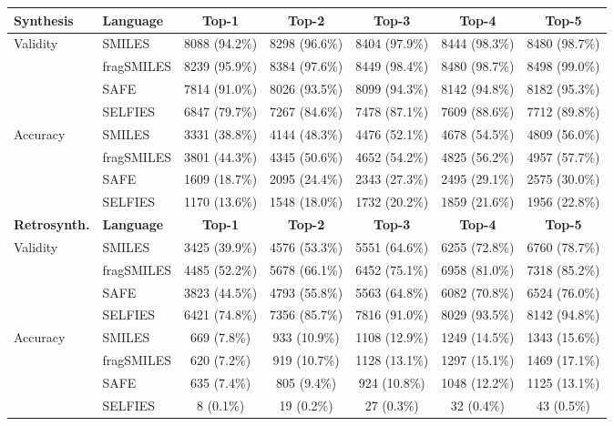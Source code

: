 \begin{tabular}{llccccc}
    \toprule
    \textbf{Synthesis} & \textbf{Language} & \textbf{Top-1} & \textbf{Top-2} & \textbf{Top-3} & \textbf{Top-4} & \textbf{Top-5} \\
    \toprule
    Validity & SMILES & 8088 (94.2\%) & 8298 (96.6\%) & 8404 (97.9\%) & 8444 (98.3\%) & 8480 (98.7\%) \\
    ~ & fragSMILES & 8239 (95.9\%) & 8384 (97.6\%) & 8449 (98.4\%) & 8480 (98.7\%) & 8498 (99.0\%) \\
    ~ & SAFE & 7814 (91.0\%) & 8026 (93.5\%) & 8099 (94.3\%) & 8142 (94.8\%) & 8182 (95.3\%) \\
    ~ & SELFIES & 6847 (79.7\%) & 7267 (84.6\%) & 7478 (87.1\%) & 7609 (88.6\%) & 7712 (89.8\%) \\
    \hline
    Accuracy & SMILES & 3331 (38.8\%) & 4144 (48.3\%) & 4476 (52.1\%) & 4678 (54.5\%) & 4809 (56.0\%) \\
    ~ & fragSMILES & 3801 (44.3\%) & 4345 (50.6\%) & 4652 (54.2\%) & 4825 (56.2\%) & 4957 (57.7\%) \\
    ~ & SAFE & 1609 (18.7\%) & 2095 (24.4\%) & 2343 (27.3\%) & 2495 (29.1\%) & 2575 (30.0\%) \\
    ~ & SELFIES & 1170 (13.6\%) & 1548 (18.0\%) & 1732 (20.2\%) & 1859 (21.6\%) & 1956 (22.8\%) \\
    \toprule
    \textbf{Retrosynth.} &  \textbf{Language} & \textbf{Top-1} & \textbf{Top-2} & \textbf{Top-3} & \textbf{Top-4} & \textbf{Top-5}\\
    \toprule
    Validity & SMILES & 3425 (39.9\%) & 4576 (53.3\%) & 5551 (64.6\%) & 6255 (72.8\%) & 6760 (78.7\%) \\
    ~ & fragSMILES & 4485 (52.2\%) & 5678 (66.1\%) & 6452 (75.1\%) & 6958 (81.0\%) & 7318 (85.2\%) \\
    ~ & SAFE & 3823 (44.5\%) & 4793 (55.8\%) & 5563 (64.8\%) & 6082 (70.8\%) & 6524 (76.0\%) \\
    ~ & SELFIES & 6421 (74.8\%) & 7356 (85.7\%) & 7816 (91.0\%) & 8029 (93.5\%) & 8142 (94.8\%) \\
    \hline
    Accuracy & SMILES & 669 (7.8\%) & 933 (10.9\%) & 1108 (12.9\%) & 1249 (14.5\%) & 1343 (15.6\%) \\
    ~ & fragSMILES & 620 (7.2\%) & 919 (10.7\%) & 1128 (13.1\%) & 1297 (15.1\%) & 1469 (17.1\%) \\
    ~ & SAFE & 635 (7.4\%) & 805 (9.4\%) & 924 (10.8\%) & 1048 (12.2\%) & 1125 (13.1\%) \\
    ~ & SELFIES & 8 (0.1\%) & 19 (0.2\%) & 27 (0.3\%) & 32 (0.4\%) & 43 (0.5\%) \\
    \bottomrule
\end{tabular}